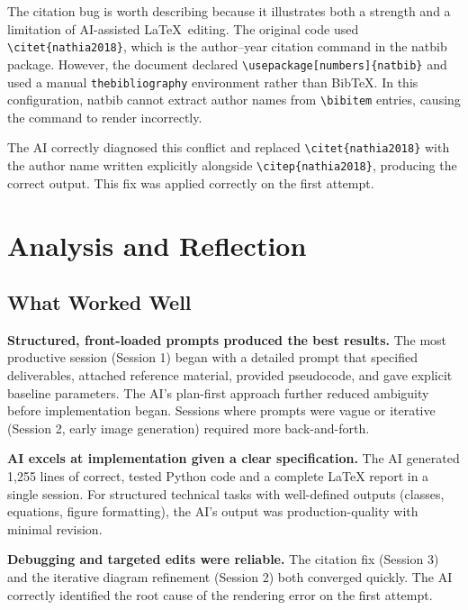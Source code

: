 \documentclass[12pt, letterpaper]{article}
\begin{document}
The citation bug is worth describing because it illustrates both a strength and a limitation of AI-assisted \LaTeX\ editing. The original code used \texttt{{\textbackslash}citet\{nathia2018\}}, which is the author--year citation command in the natbib package. However, the document declared \texttt{{\textbackslash}usepackage[numbers]\{natbib\}} and used a manual \texttt{thebibliography} environment rather than BibTeX. In this configuration, natbib cannot extract author names from \texttt{{\textbackslash}bibitem} entries, causing the command to render incorrectly.

The AI correctly diagnosed this conflict and replaced \texttt{{\textbackslash}citet\{nathia2018\}} with the author name written explicitly alongside \texttt{{\textbackslash}citep\{nathia2018\}}, producing the correct output. This fix was applied correctly on the first attempt.

\section{Analysis and Reflection}

\subsection{What Worked Well}

\textbf{Structured, front-loaded prompts produced the best results.} The most productive session (Session 1) began with a detailed prompt that specified deliverables, attached reference material, provided pseudocode, and gave explicit baseline parameters. The AI's plan-first approach further reduced ambiguity before implementation began. Sessions where prompts were vague or iterative (Session 2, early image generation) required more back-and-forth.

\textbf{AI excels at implementation given a clear specification.} The AI generated 1,255 lines of correct, tested Python code and a complete LaTeX report in a single session. For structured technical tasks with well-defined outputs (classes, equations, figure formatting), the AI's output was production-quality with minimal revision.

\textbf{Debugging and targeted edits were reliable.} The citation fix (Session 3) and the iterative diagram refinement (Session 2) both converged quickly. The AI correctly identified the root cause of the rendering error on the first attempt.
\end{document}
